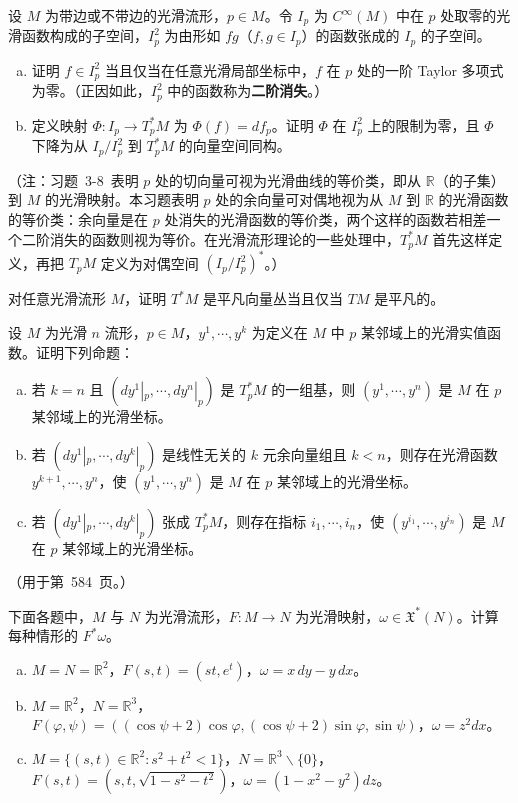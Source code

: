 \documentclass[../../main.tex]{subfiles}
\begin{document}
\begin{exercise}\label{exercise:ch11-04}
设 $M$ 为带边或不带边的光滑流形，$p\in M$。令 $I_p$ 为 $C^\infty(M)$ 中在 $p$ 处取零的光滑函数构成的子空间，$I_p^2$ 为由形如 $fg$（$f,g\in I_p$）的函数张成的 $I_p$ 的子空间。
\begin{enumerate}[(a)]
\item 证明 $f\in I_p^2$ 当且仅当在任意光滑局部坐标中，$f$ 在 $p$ 处的一阶 Taylor 多项式为零。（正因如此，$I_p^2$ 中的函数称为\textbf{二阶消失}。）
\item 定义映射 $\Phi\colon I_p\to T_p^*M$ 为 $\Phi(f)=df_p$。证明 $\Phi$ 在 $I_p^2$ 上的限制为零，且 $\Phi$ 下降为从 $I_p/I_p^2$ 到 $T_p^*M$ 的向量空间同构。
\end{enumerate}
（注：习题~3-8~表明 $p$ 处的切向量可视为光滑曲线的等价类，即从 $\mathbb{R}$（的子集）到 $M$ 的光滑映射。本习题表明 $p$ 处的余向量可对偶地视为从 $M$ 到 $\mathbb{R}$ 的光滑函数的等价类：余向量是在 $p$ 处消失的光滑函数的等价类，两个这样的函数若相差一个二阶消失的函数则视为等价。在光滑流形理论的一些处理中，$T_p^*M$ 首先这样定义，再把 $T_pM$ 定义为对偶空间 $(I_p/I_p^2)^*$。）
\end{exercise}

\begin{exercise}\label{exercise:ch11-05}
对任意光滑流形 $M$，证明 $T^*M$ 是平凡向量丛当且仅当 $TM$ 是平凡的。
\end{exercise}

\begin{exercise}\label{exercise:ch11-06}
设 $M$ 为光滑 $n$ 流形，$p\in M$，$y^1,\cdots ,y^k$ 为定义在 $M$ 中 $p$ 某邻域上的光滑实值函数。证明下列命题：
\begin{enumerate}[(a)]
\item 若 $k=n$ 且 $(dy^1|_p,\cdots ,dy^n|_p)$ 是 $T_p^*M$ 的一组基，则 $(y^1,\cdots ,y^n)$ 是 $M$ 在 $p$ 某邻域上的光滑坐标。
\item 若 $(dy^1|_p,\cdots ,dy^k|_p)$ 是线性无关的 $k$ 元余向量组且 $k<n$，则存在光滑函数 $y^{k+1},\cdots ,y^n$，使 $(y^1,\cdots ,y^n)$ 是 $M$ 在 $p$ 某邻域上的光滑坐标。
\item 若 $(dy^1|_p,\cdots ,dy^k|_p)$ 张成 $T_p^*M$，则存在指标 $i_1,\cdots ,i_n$，使 $(y^{i_1},\cdots ,y^{i_n})$ 是 $M$ 在 $p$ 某邻域上的光滑坐标。
\end{enumerate}
（用于第~584~页。）
\end{exercise}

\begin{exercise}\label{exercise:ch11-07}
下面各题中，$M$ 与 $N$ 为光滑流形，$F\colon M\to N$ 为光滑映射，$\omega\in\mathfrak X^*(N)$。计算每种情形的 $F^*\omega$。
\begin{enumerate}[(a)]
\item $M=N=\mathbb{R}^2$，$F(s,t)=(st,e^t)$，$\omega=x\,dy-y\,dx$。
\item $M=\mathbb{R}^2$，$N=\mathbb{R}^3$，$F(\varphi,\psi)=((\cos\psi+2)\cos\varphi,(\cos\psi+2)\sin\varphi,\sin\psi)$，$\omega=z^2 dx$。
\item $M=\{(s,t)\in\mathbb{R}^2:s^2+t^2<1\}$，$N=\mathbb{R}^3\smallsetminus\{0\}$，$F(s,t)=(s,t,\sqrt{1-s^2-t^2})$，$\omega=(1-x^2-y^2)dz$。
\end{enumerate}
\end{exercise}
\end{document}
